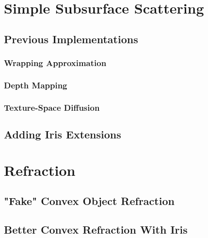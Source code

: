 \documentclass[a4paper, 12pt]{article}
\begin{document}
\section{Simple Subsurface Scattering}



\subsection{Previous Implementations}

\subsubsection{Wrapping Approximation}

\subsubsection{Depth Mapping}

\subsubsection{Texture-Space Diffusion}

\subsection{Adding Iris Extensions}



\section{Refraction}

\subsection{"Fake" Convex Object Refraction}

\subsection{Better Convex Refraction With Iris}
\end{document}
